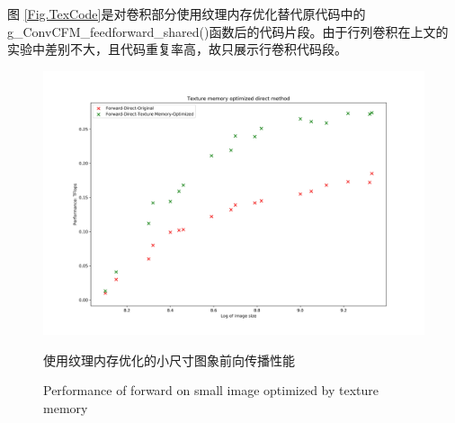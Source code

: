 \par 图 \ref{Fig.TexCode}是对卷积部分使用纹理内存优化替代原代码中的g\_ConvCFM\_feedforward\_shared()函数后的代码片段。由于行列卷积在上文的实验中差别不大，且代码重复率高，故只展示行卷积代码段。
\begin{figure}
	\centering
	\includegraphics[width=15cm]{figures/CNN-HALF-TEXOPT.jpg}
	\renewcommand{\thefigure}{\arabic{section}-\arabic{figure} }
	\renewcommand{\figurename}{图}
	\caption{使用纹理内存优化的小尺寸图象前向传播性能}
	\addtocounter{figure}{-1}
	\renewcommand{\thefigure}{\arabic{section}-\arabic{figure} }
	\renewcommand{\figurename}{Figure}
	\caption{Performance of forward on small image optimized by texture memory}
	\label{Fig.TEXVSSHARED}
\end{figure}
